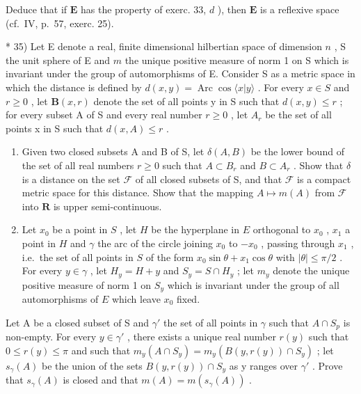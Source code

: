Deduce that if \(\mathbf{E}\) has the property of exerc. 33, \(d\) ), then \(\mathbf{E}\) is a reflexive space (cf.~IV, p.~57, exerc. 25).

* 35) Let E denote a real, finite dimensional hilbertian space of dimension \(n\) , S the unit sphere of E and \(m\) the unique positive measure of norm 1 on S which is invariant under the group of automorphisms of E. Consider S as a metric space in which the distance is defined by \(d(x, y) = \operatorname{Arc} \cos \langle x | y \rangle\) . For every \(x \in S\) and \(r \geqslant 0\) , let \(\mathbf{B}(x, r)\) denote the set of all points y in S such that \(d(x, y) \leqslant r\) ; for every subset A of S and every real number \(r \geqslant 0\) , let \(A_r\) be the set of all points x in S such that \(d(x, A) \leqslant r\) .

\begin{enumerate}
\def\labelenumi{\alph{enumi})}
\item
  Given two closed subsets A and B of S, let \(\delta(A, B)\) be the lower bound of the set of all real numbers \(r \geqslant 0\) such that \(A \subset B_r\) and \(B \subset A_r\) . Show that \(\delta\) is a distance on the set \(\mathcal{F}\) of all closed subsets of S, and that \(\mathcal{F}\) is a compact metric space for this distance. Show that the mapping \(A \mapsto m(A)\) from \(\mathcal{F}\) into \(\mathbf{R}\) is upper semi-continuous.
\item
  Let \(x_0\) be a point in \(S\) , let \(H\) be the hyperplane in \(E\) orthogonal to \(x_0\) , \(x_1\) a point in \(H\) and \(\gamma\) the arc of the circle joining \(x_0\) to \(-x_0\) , passing through \(x_1\) , i.e.~the set of all points in \(S\) of the form \(x_0 \sin \theta + x_1 \cos \theta\) with \(|\theta| \leqslant \pi / 2\) . For every \(y \in \gamma\) , let \(H_y = H + y\) and \(S_y = S \cap H_y\) ; let \(m_y\) denote the unique positive measure of norm 1 on \(S_y\) which is invariant under the group of all automorphisms of \(E\) which leave \(x_0\) fixed.
\end{enumerate}

Let A be a closed subset of S and \(\gamma'\) the set of all points in \(\gamma\) such that \(A \cap S_{p}\) is non-empty. For every \(y \in \gamma'\) , there exists a unique real number \(r(y)\) such that \(0 \leqslant r(y) \leqslant \pi\) and such that \(m_{y}(A \cap S_{y}) = m_{y}(B(y, r(y)) \cap S_{y})\) ; let \(s_{\gamma}(A)\) be the union of the sets \(B(y, r(y)) \cap S_{y}\) as y ranges over \(\gamma'\) . Prove that \(s_{\gamma}(A)\) is closed and that \(m(A) = m(s_{\gamma}(A))\) .

